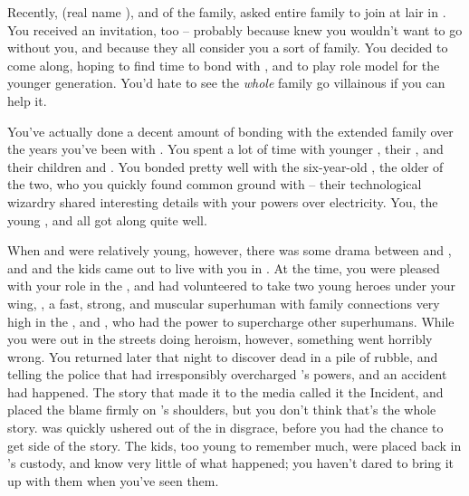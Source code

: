 \documentclass[char]{LRSguildcamp1}
\begin{document}
Recently, \cGrandma{\MYsupername} (real name \cGrandma{\intro}), \cGrandma{\villain} and \cGrandma{\familyleader} of the \cGrandma{\formal} family, asked \cGrandma{\their} entire family to join \cGrandma{\them} at \cGrandma{\their} lair in \pCityGrandma{}.  You received an invitation, too -- probably because \cGrandma{\they} knew you wouldn't want \cGrad{} to go without you, and because they all consider you a sort of family.  You decided to come along, hoping to find time to bond with \cGrad{}, and to play role model for the younger generation.  You'd hate to see the \emph{whole} family go villainous if you can help it.

You've actually done a decent amount of bonding with the extended family over the years you've been with \cOldest{}.  You spent a lot of time with \cOldest{\their} younger \cArchitect{\sibling} \cArchitect{\intro}, their \cAS{\spouse} \cAS{\intro}, and their children \cTeen{} and \cTween{}. You bonded pretty well with the six-year-old \cTeen{}, the older of the two, who you quickly found common ground with -- their technological wizardry shared interesting details with your powers over electricity.  You, the young \cTeen{}, and \cAS{} all got along quite well.

When \cTeen{} and \cTween{} were relatively young, however, there was some drama between \cArchitect{} and \cAS{}, and \cAS{} and the kids came out to live with you in \pCityO{}.  At the time, you were pleased with your role in the \cHeroLeague{\intro}, and had volunteered to take two young heroes under your wing, \cJuggernaut{}, a fast, strong, and muscular superhuman with family connections very high in the \cHeroLeague{}, and \cYS{\MYsupername}, who had the power to supercharge other superhumans.  While you were out in the streets doing heroism, however, something went horribly wrong.  You returned later that night to discover \cAS{} dead in a pile of rubble, and \cJuggernaut{} telling the police that \cYS{\MYsupername} had irresponsibly overcharged \cJuggernaut{}'s powers, and an accident had happened.  The story that made it to the media called it the \pCityO{} Incident, and placed the blame firmly on \cYS{\MYsupername}'s shoulders, but you don't think that's the whole story.  \cYS{} was quickly ushered out of the \cHeroLeague{} in disgrace, before you had the chance to get \cYS{\their} side of the story.  The kids, too young to remember much, were placed back in \cArchitect{}'s custody, and know very little of what happened; you haven't dared to bring it up with them when you've seen them.
\end{document}
